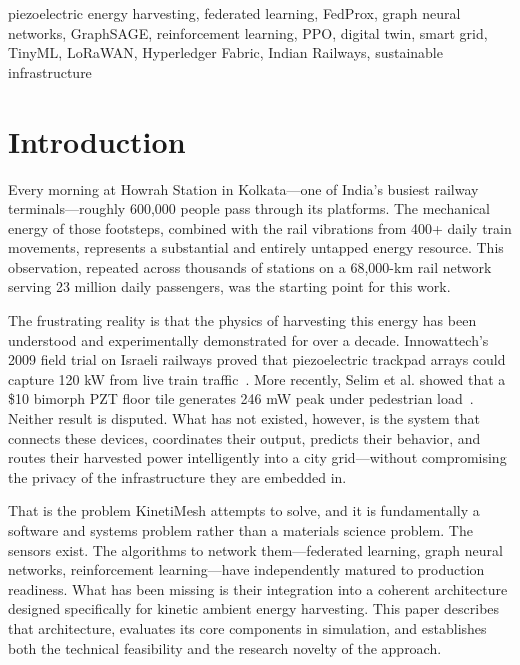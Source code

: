 \documentclass[conference]{IEEEtran}
\begin{document}
\begin{IEEEkeywords}
piezoelectric energy harvesting, federated learning, FedProx, graph neural networks, GraphSAGE, reinforcement learning, PPO, digital twin, smart grid, TinyML, LoRaWAN, Hyperledger Fabric, Indian Railways, sustainable infrastructure
\end{IEEEkeywords}

\section{Introduction}

Every morning at Howrah Station in Kolkata—one of India's busiest railway terminals—roughly 600,000 people pass through its platforms. The mechanical energy of those footsteps, combined with the rail vibrations from 400+ daily train movements, represents a substantial and entirely untapped energy resource. This observation, repeated across thousands of stations on a 68,000-km rail network serving 23 million daily passengers, was the starting point for this work.

The frustrating reality is that the physics of harvesting this energy has been understood and experimentally demonstrated for over a decade. Innowattech's 2009 field trial on Israeli railways proved that piezoelectric trackpad arrays could capture 120 kW from live train traffic~\cite{innowattech2010}. More recently, Selim et al. showed that a \$10 bimorph PZT floor tile generates 246 mW peak under pedestrian load~\cite{selim2024}. Neither result is disputed. What has not existed, however, is the system that connects these devices, coordinates their output, predicts their behavior, and routes their harvested power intelligently into a city grid—without compromising the privacy of the infrastructure they are embedded in.

That is the problem KinetiMesh attempts to solve, and it is fundamentally a software and systems problem rather than a materials science problem. The sensors exist. The algorithms to network them—federated learning, graph neural networks, reinforcement learning—have independently matured to production readiness. What has been missing is their integration into a coherent architecture designed specifically for kinetic ambient energy harvesting. This paper describes that architecture, evaluates its core components in simulation, and establishes both the technical feasibility and the research novelty of the approach.
\end{document}
